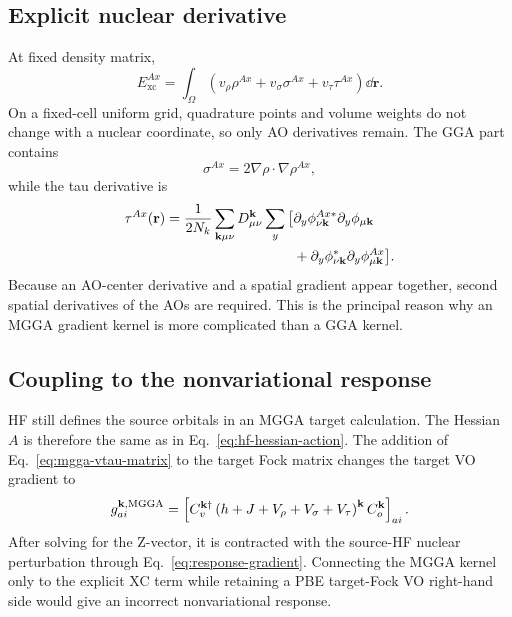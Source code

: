 \subsection{Explicit nuclear derivative}

At fixed density matrix,
\begin{equation}
  E_{\mathrm{xc}}^{Ax}
  =\int_\Omega\left(
    v_\rho\rho^{Ax}
    +v_\sigma\sigma^{Ax}
    +v_\tau\tau^{Ax}\right)\dd\mathbf r.
  \label{eq:mgga-xc-derivative}
\end{equation}
On a fixed-cell uniform grid, quadrature points and volume weights do not
change with a nuclear coordinate, so only AO derivatives remain.  The GGA
part contains
\begin{equation}
  \sigma^{Ax}=2\nabla\rho\cdot\nabla\rho^{Ax},
  \label{eq:mgga-sigma-derivative}
\end{equation}
while the tau derivative is
\begin{align}
  \tau^{Ax}(\mathbf r)
  =\frac{1}{2N_k}\sum_{\mathbf{k}\mu\nu}D_{\mu\nu}^{\mathbf{k}}
   \sum_y\big[&
   \partial_y\phi_{\nu\mathbf{k}}^{Ax *}
   \partial_y\phi_{\mu\mathbf{k}}
  \notag\\
   &+\partial_y\phi_{\nu\mathbf{k}}^{*}
   \partial_y\phi_{\mu\mathbf{k}}^{Ax}\big].
  \label{eq:mgga-tau-derivative}
\end{align}
Because an AO-center derivative and a spatial gradient appear together,
second spatial derivatives of the AOs are required.  This is the principal
reason why an MGGA gradient kernel is more complicated than a GGA kernel.

\subsection{Coupling to the nonvariational response}

HF still defines the source orbitals in an MGGA target calculation.  The
Hessian $A$ is therefore the same as in Eq.~\eqref{eq:hf-hessian-action}.  The
addition of Eq.~\eqref{eq:mgga-vtau-matrix} to the target Fock matrix changes
the target VO gradient to
\begin{equation}
  g_{ai}^{\mathbf{k},\mathrm{MGGA}}
  =\left[C_v^{\mathbf{k}\dagger}
   \left(h+J+V_\rho+V_\sigma+V_\tau\right)^{\mathbf{k}}
   C_o^{\mathbf{k}}\right]_{ai}.
  \label{eq:mgga-target-vo}
\end{equation}
After solving for the Z-vector, it is contracted with the source-HF nuclear
perturbation through Eq.~\eqref{eq:response-gradient}.  Connecting the MGGA
kernel only to the explicit XC term while retaining a PBE target-Fock VO
right-hand side would give an incorrect nonvariational response.


